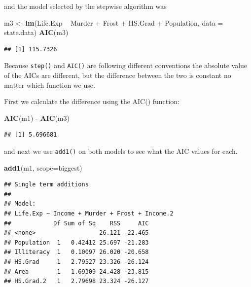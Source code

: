\documentclass[]{book}
\newenvironment{Shaded}{\begin{snugshade}}{\end{snugshade}}
\newcommand{\KeywordTok}[1]{\textcolor[rgb]{0.13,0.29,0.53}{\textbf{{#1}}}}
\newcommand{\DataTypeTok}[1]{\textcolor[rgb]{0.13,0.29,0.53}{{#1}}}
\newcommand{\StringTok}[1]{\textcolor[rgb]{0.31,0.60,0.02}{{#1}}}
\newcommand{\NormalTok}[1]{{#1}}
\theoremstyle{definition}
\theoremstyle{definition}
\theoremstyle{remark}
\begin{document}
and the model selected by the stepwise algorithm was

\begin{Shaded}
\begin{Highlighting}[]
\NormalTok{m3 <-}\StringTok{ }\KeywordTok{lm}\NormalTok{(Life.Exp ~}\StringTok{ }\NormalTok{Murder +}\StringTok{ }\NormalTok{Frost +}\StringTok{ }\NormalTok{HS.Grad +}\StringTok{ }\NormalTok{Population, }\DataTypeTok{data =} \NormalTok{state.data)}
\KeywordTok{AIC}\NormalTok{(m3)}
\end{Highlighting}
\end{Shaded}

\begin{verbatim}
## [1] 115.7326
\end{verbatim}

Because \texttt{step()} and \texttt{AIC()} are following different
conventions the absolute value of the AICs are different, but the
difference between the two is constant no matter which function we use.

First we calculate the difference using the AIC() function:

\begin{Shaded}
\begin{Highlighting}[]
\KeywordTok{AIC}\NormalTok{(m1) -}\StringTok{ }\KeywordTok{AIC}\NormalTok{(m3)}
\end{Highlighting}
\end{Shaded}

\begin{verbatim}
## [1] 5.696681
\end{verbatim}

and next we use \texttt{add1()} on both models to see what the AIC
values for each.

\begin{Shaded}
\begin{Highlighting}[]
\KeywordTok{add1}\NormalTok{(m1, }\DataTypeTok{scope=}\NormalTok{biggest)}
\end{Highlighting}
\end{Shaded}

\begin{verbatim}
## Single term additions
## 
## Model:
## Life.Exp ~ Income + Murder + Frost + Income.2
##            Df Sum of Sq    RSS     AIC
## <none>                  26.121 -22.465
## Population  1   0.42412 25.697 -21.283
## Illiteracy  1   0.10097 26.020 -20.658
## HS.Grad     1   2.79527 23.326 -26.124
## Area        1   1.69309 24.428 -23.815
## HS.Grad.2   1   2.79698 23.324 -26.127
\end{verbatim}
\end{document}
